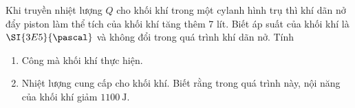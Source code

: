 		\begin{vd}
			Khi truyền nhiệt lượng $Q$ cho khối khí trong một cylanh hình trụ thì khí dãn nở đẩy piston làm thể tích của khối khí tăng thêm 7 lít. Biết áp suất của khối khí là $\SI{3E5}{\pascal}$ và không đổi trong quá trình khí dãn nở. Tính
			\begin{enumerate}[label=\alph*)]
				\item Công mà khối khí thực hiện.
				\item Nhiệt lượng cung cấp cho khối khí. Biết rằng trong quá trình này, nội năng của khối khí giảm $\SI{1100}{\joule}$.
			\end{enumerate}
		\end{vd}
